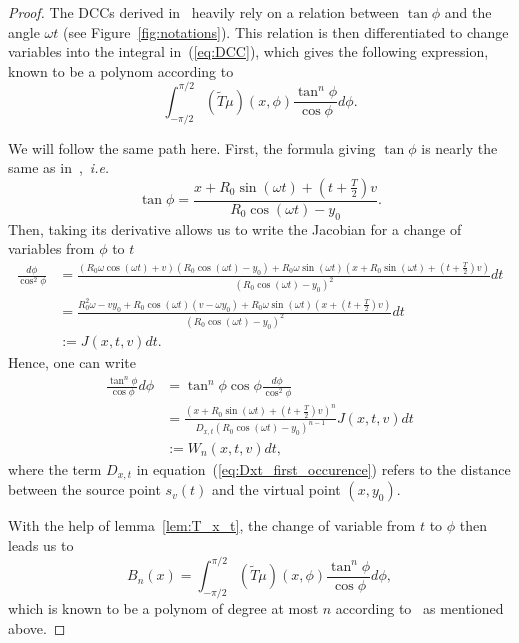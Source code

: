 \documentclass[a4paper]{article}
\numberwithin{equation}{section}
\begin{document}
\begin{proof}
The DCCs derived in~\cite{clackdoyle2015consistency} heavily rely on a relation between $\tan \phi$ and the angle $\omega t$ (see Figure~\ref{fig:notations}). This relation is then differentiated to change variables into the integral in~(\ref{eq:DCC}), which gives the following expression, known to be a polynom according to~\cite{clackdoyle2013necessary}
\begin{equation}
	\int_{-\pi/2}^{\pi/2}  \left( \tilde{T}\mu	\right)(x,\phi) \frac{\tan^n \phi}{\cos \phi} d\phi.
\end{equation}

We will follow the same path here. First, the formula giving $\tan \phi$ is nearly the same as in~\cite{clackdoyle2015consistency},~\emph{i.e.}
$$
\tan \phi = \frac{x + R_0 \sin(\omega t) + \left( t + \frac{T}{2} \right)v}{R_0 \cos(\omega t) - y_0}.
$$
Then, taking its derivative allows us to write the Jacobian for a change of variables from $\phi$ to $t$
\begin{align*}
\frac{d\phi}{\cos^2 \phi} &= \frac{ \left( R_0 \omega \cos(\omega t) +v \right) \left( R_0 \cos(\omega t) - y_0 \right) + R_0 \omega \sin(\omega t) \left( x + R_0 \sin(\omega t) + \left( t + \frac{T}{2} \right)v \right) }{ \left( R_0 \cos(\omega t) - y_0 \right)^2 } dt \\
 &= \frac{ R_0^2 \omega - v y_0 + R_0 \cos(\omega t)(v-\omega y_0) + R_0 \omega \sin(\omega t)(x + \left( t + \frac{T}{2} \right)v ) }{ \left( R_0 \cos(\omega t) - y_0 \right)^2 } dt\\
 &:= J(x,t,v) dt.
\end{align*}
Hence, one can write
\begin{align}
	\frac{\tan^n \phi}{\cos \phi} d\phi &= \tan^n \phi \cos \phi \frac{d\phi}{\cos^2 \phi} \\
	&= \frac{ \left( x+R_0 \sin(\omega t) + \left( t + \frac{T}{2} \right)v \right)^n }{D_{x,t} \left( R_0 \cos(\omega t) - y_0 \right)^{n-1}} J(x,t,v) dt \label{eq:Dxt_first_occurence} \\
	&:= W_n(x,t,v) dt,
\end{align}
where the term $D_{x,t}$ in equation~(\ref{eq:Dxt_first_occurence}) refers to the distance between the source point $s_v(t)$ and the virtual point $(x,y_0)$.

With the help of lemma~\ref{lem:T_x_t}, the change of variable from $t$ to $\phi$ then leads us to
\begin{equation}
	B_n(x) = \int_{-\pi/2}^{\pi/2}  \left( \tilde{T}\mu	\right)(x,\phi) \frac{\tan^n \phi}{\cos \phi} d\phi,
\end{equation}
which is known to be a polynom of degree at most $n$ according to~\cite{clackdoyle2013necessary} as mentioned above.
\end{proof}
\end{document}

